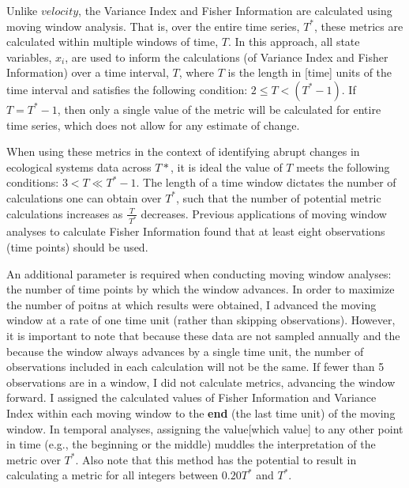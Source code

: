 \documentclass[12pt,twoside,openany]{reedthesis}
\begin{document}
Unlike \(velocity\), the Variance Index and Fisher Information are calculated using moving window analysis. That is, over the entire time series, \(T^*\), these metrics are calculated within multiple windows of time, \(T\). In this approach, all state variables, \(x_i\), are used to inform the calculations (of Variance Index and Fisher Information) over a time interval, \(T\), where \(T\) is the length in {[}time{]} units of the time interval and satisfies the following condition: \(2\leq T < (T^*-1)\). If \(T = T^*-1\), then only a single value of the metric will be calculated for entire time series, which does not allow for any estimate of change.

When using these metrics in the context of identifying abrupt changes in ecological systems data across \(T*\), it is ideal the value of \(T\) meets the following conditions: \(3 < T \ll T^*-1\). The length of a time window dictates the number of calculations one can obtain over \(T^*\), such that the number of potential metric calculations increases as \(\frac{T}{\ T^*}\) decreases. Previous applications of moving window analyses to calculate Fisher Information found that at least eight observations (time points) should be used.

An additional parameter is required when conducting moving window analyses: the number of time points by which the window advances. In order to maximize the number of poitns at which results were obtained, I advanced the moving window at a rate of one time unit (rather than skipping observations). However, it is important to note that because these data are not sampled annually and the because the window always advances by a single time unit, the number of observations included in each calculation will not be the same. If fewer than 5 observations are in a window, I did not calculate metrics, advancing the window forward. I assigned the calculated values of Fisher Information and Variance Index within each moving window to the \textbf{end} (the last time unit) of the moving window. In temporal analyses, assigning the value{[}which value{]} to any other point in time (e.g., the beginning or the middle) muddles the interpretation of the metric over \(T^*\). Also note that this method has the potential to result in calculating a metric for all integers between \(0.20 T^*\) and \(T^*\).
\end{document}
